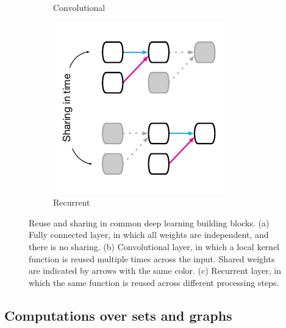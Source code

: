 \begin{figure}[t!]
\begin{subfigure}[b]{0.32\textwidth}
    \caption{Convolutional}
\end{subfigure}
\begin{subfigure}[b]{0.32\textwidth}
    \includegraphics[width=\textwidth]{figures/rnn}
    \caption{Recurrent}
\end{subfigure}
\caption{Reuse and sharing in common deep learning building blocks. (a) Fully connected layer, in which all weights are independent, and there is no sharing. (b) Convolutional layer, in which a local kernel function is reused multiple times across the input. Shared weights are indicated by arrows with the same color. (c) Recurrent layer, in which the same function is reused across different processing steps.}
\label{fig:building-blocks}
\end{figure}


\subsection{Computations over sets and graphs}
\label{sec:sets-and-graphs}

